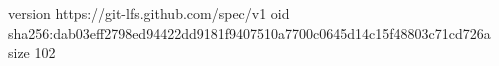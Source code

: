 version https://git-lfs.github.com/spec/v1
oid sha256:dab03eff2798ed94422dd9181f9407510a7700c0645d14c15f48803c71cd726a
size 102
